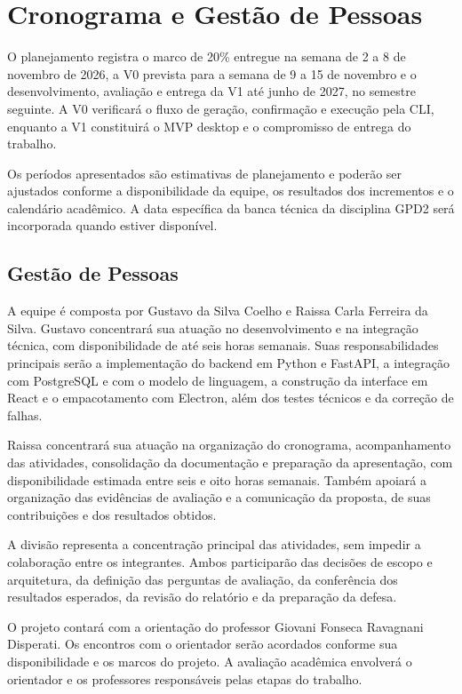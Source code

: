 \chapter{Cronograma e Gestão de Pessoas}
\label{cap:05}

O planejamento registra o marco de 20\% entregue na semana de 2 a 8 de novembro de 2026, a V0 prevista para a semana de 9 a 15 de novembro e o desenvolvimento, avaliação e entrega da V1 até junho de 2027, no semestre seguinte. A V0 verificará o fluxo de geração, confirmação e execução pela CLI, enquanto a V1 constituirá o MVP desktop e o compromisso de entrega do trabalho.

Os períodos apresentados são estimativas de planejamento e poderão ser ajustados conforme a disponibilidade da equipe, os resultados dos incrementos e o calendário acadêmico. A data específica da banca técnica da disciplina GPD2 será incorporada quando estiver disponível.

\section{Gestão de Pessoas}

A equipe é composta por Gustavo da Silva Coelho e Raissa Carla Ferreira da Silva. Gustavo concentrará sua atuação no desenvolvimento e na integração técnica, com disponibilidade de até seis horas semanais. Suas responsabilidades principais serão a implementação do backend em Python e FastAPI, a integração com PostgreSQL e com o modelo de linguagem, a construção da interface em React e o empacotamento com Electron, além dos testes técnicos e da correção de falhas.

Raissa concentrará sua atuação na organização do cronograma, acompanhamento das atividades, consolidação da documentação e preparação da apresentação, com disponibilidade estimada entre seis e oito horas semanais. Também apoiará a organização das evidências de avaliação e a comunicação da proposta, de suas contribuições e dos resultados obtidos.

A divisão representa a concentração principal das atividades, sem impedir a colaboração entre os integrantes. Ambos participarão das decisões de escopo e arquitetura, da definição das perguntas de avaliação, da conferência dos resultados esperados, da revisão do relatório e da preparação da defesa.

O projeto contará com a orientação do professor Giovani Fonseca Ravagnani Disperati. Os encontros com o orientador serão acordados conforme sua disponibilidade e os marcos do projeto. A avaliação acadêmica envolverá o orientador e os professores responsáveis pelas etapas do trabalho.

